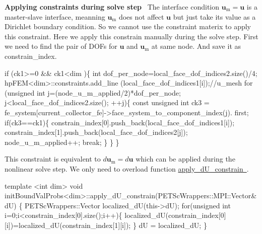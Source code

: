 {\bfseries Applying constraints during solve step}~\newline
 The interface condition $\boldsymbol{u}_\text{m}=\boldsymbol{u}$ is a master-\/slave interface, meanning $\boldsymbol{u}_\text{m}$ does not affect $\boldsymbol{u}$ but just take its value as a Dirichlet boundary condition. So we cannot use the constraint materix to apply this constraint. Here we apply this constrain manually during the solve step. First we need to find the pair of D\+O\+Fs for $\boldsymbol{u}$ and $\boldsymbol{u}_\text{m}$ at same node. And save it as constrain\+\_\+index. 
\begin{DoxyCode}
\textcolor{keywordflow}{if} (ck1>=0 && ck1<dim )\{
        \textcolor{keywordtype}{int} dof\_per\_node=local\_face\_dof\_indices2.size()/4;
        hpFEM<dim>::constraints.add\_line (local\_face\_dof\_indices1[i]);\textcolor{comment}{//u\_mesh                             
                               }
        \textcolor{keywordflow}{for} (\textcolor{keywordtype}{unsigned} \textcolor{keywordtype}{int} j=(node\_u\_m\_applied/2)*dof\_per\_node; j<local\_face\_dof\_indices2.size(); ++j)\{
            \textcolor{keyword}{const} \textcolor{keywordtype}{unsigned} \textcolor{keywordtype}{int} ck3 = fe\_system[current\_collector\_fe]->face\_system\_to\_component\_index(j).
      first;
            \textcolor{keywordflow}{if}(ck3==ck1)\{
                constrain\_index[0].push\_back(local\_face\_dof\_indices1[i]);
                constrain\_index[1].push\_back(local\_face\_dof\_indices2[j]);
                node\_u\_m\_applied++;
                \textcolor{keywordflow}{break};
            \}
        \}                       
    \}   
\end{DoxyCode}
 This constraint is equivalent to $d\boldsymbol{u}_\text{m}=d\boldsymbol{u}$ which can be applied during the nonlinear solve step. We only need to overload function \mbox{\hyperlink{classsolve_class_a029ece57f667fa697cb29eb482eff31b}{apply\+\_\+d\+U\+\_\+constrain }}. 
\begin{DoxyCode}
\textcolor{keyword}{template} <\textcolor{keywordtype}{int} dim>
\textcolor{keywordtype}{void} initBoundValProbs<dim>::apply\_dU\_constrain(PETScWrappers::MPI::Vector& dU)
\{
    PETScWrappers::Vector localized\_dU(this->dU);   
  \textcolor{keywordflow}{for}(\textcolor{keywordtype}{unsigned} \textcolor{keywordtype}{int} i=0;i<constrain\_index[0].size();i++)\{
        localized\_dU(constrain\_index[0][i])=localized\_dU(constrain\_index[1][i]);
    \}
    dU = localized\_dU;
\}
\end{DoxyCode}
